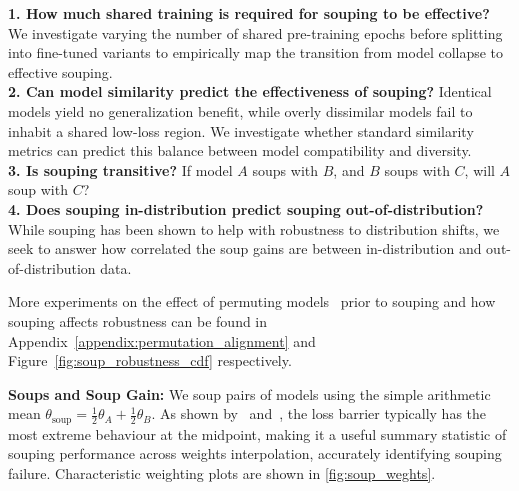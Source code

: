 \textbf{1. How much shared training is required for souping to be effective?} We investigate varying the number of shared pre-training epochs before splitting into fine-tuned variants to empirically map the transition from model collapse to effective souping.\\
\textbf{2. Can model similarity predict the effectiveness of souping?} Identical models yield no generalization benefit, while overly dissimilar models fail to inhabit a shared low-loss region. We investigate whether standard similarity metrics can predict this balance between model compatibility and diversity.\\
\textbf{3. Is souping transitive?} If model $A$ soups with $B$, and $B$ soups with $C$, will $A$ soup with $C$? \\
\textbf{4. Does souping in-distribution predict souping out-of-distribution?} While souping has been shown to help with robustness to distribution shifts, we seek to answer how correlated the soup gains are between in-distribution and out-of-distribution data.

More experiments on the effect of permuting models~\cite{gitrebasin} prior to souping and how souping affects robustness can be found in Appendix~\ref{appendix:permutation_alignment} and Figure~\ref{fig:soup_robustness_cdf} respectively.

\textbf{Soups and Soup Gain:} We soup pairs of models using the simple arithmetic mean $\theta_{\text{soup}} = \frac{1}{2}\theta_A + \frac{1}{2}\theta_B$. As shown by~\citet{gitrebasin} and~\cite{transientperformancegains}, the loss barrier typically has the most extreme behaviour at the midpoint, making it a useful summary statistic of souping performance across weights interpolation, accurately identifying souping failure. Characteristic weighting plots are shown in \ref{fig:soup_weghts}. 


